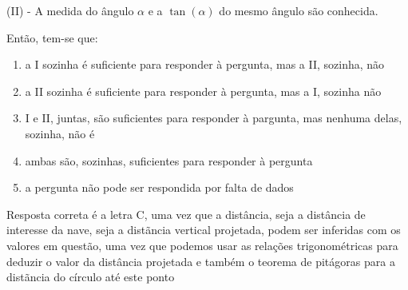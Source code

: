 \begin{multicols*}{2}
\begin{enumerate}
    (II) - A medida do ângulo $\alpha$ e a $\tan(\alpha)$ do mesmo ângulo são conhecida.
    
    Então, tem-se que:
    \begin{enumerate}
    \item a I sozinha é suficiente para responder à pergunta, mas a II, sozinha, não
    \item a II sozinha é suficiente para responder à pergunta, mas a I, sozinha não
    \item I e II, juntas, são suficientes para responder à pargunta, mas nenhuma delas, sozinha, não é
    \item ambas são, sozinhas, suficientes para responder à pergunta 
    \item a pergunta não pode ser respondida por falta de dados 
    \end{enumerate}
    Resposta correta é a letra C, uma vez que a distância, seja a distância de interesse da nave, seja a distãncia vertical projetada, podem ser inferidas com os valores em questão, uma vez que podemos usar as relações trigonométricas para deduzir o valor da distância projetada e também o teorema de pitágoras para a distãncia do círculo até este ponto
    \end{enumerate}
    
    
    
    
    
    
\end{multicols*}
